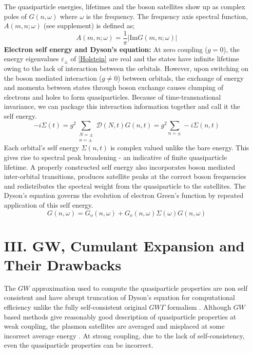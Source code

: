 \documentclass[%
 reprint,
 amsmath,amssymb,
 aps,prl,
floatfix
]{revtex4-2}
\begin{document}
The quasiparticle energies, lifetimes and the boson satellites show up as complex poles of $G(n,\omega)$ where $\omega$ is the frequency. The frequency axis spectral function, $A(m,n;\omega)$ (see supplement) is defined as;
 \begin{equation}
     A(m,n;\omega) = \frac{1}{\pi} |\text{Im}G(m,n;\omega)|
 \end{equation}
\textbf{Electron self energy and Dyson's equation: }
  At zero coupling ($g=0$), the energy eigenvalues $\varepsilon_{\pm}$ of \eqref{Holstein} are real and the states have infinite lifetime owing to the lack of interaction between the orbitals. However, upon switching on the boson mediated interaction ($g\neq0$) between orbitals, the exchange of energy and momenta between states through boson exchange causes clumping of electrons and holes to form quasiparticles. Because of time-transnational invariance, we can package this interaction information together and call it the self energy.
\begin{equation}
    -i\Sigma(t) = g^2\!\sum_{\substack{N=\pm\\n=\pm}} \mathcal{D}(N,t)G(n, t)= g^2 \!\sum_{n = \pm}\!\!\!-i\Sigma(n,t)
\label{self-energy}
\end{equation}
Each orbital's self energy $\Sigma(n, t)$ is complex valued unlike the bare energy. This gives rise to spectral peak broadening - an indicative of finite quasiparticle lifetime. A properly constructed self energy also incorporates boson mediated inter-orbital transitions, produces satellite peaks at the correct boson frequencies and redistributes the spectral weight from the quasiparticle to the satellites. The Dyson's equation governs the evolution of electron Green's function by repeated application of this self energy.
\begin{equation}
  G(n,\omega) = G_o(n,\omega) + G_o(n,\omega)\Sigma(\omega) G(n,\omega)
  \label{Dyson equation}
\end{equation}
\section{III. GW, Cumulant Expansion and Their Drawbacks}
The $GW$ approximation used to compute the quasiparticle properties are non self consistent and have abrupt truncation of Dyson's equation for computational efficiency unlike the fully self-consistent original $GW\Gamma$ formalism \cite{hedin_new_1965}. Although $GW$ based methods give reasonably good description of quasiparticle properties at weak coupling, the plasmon satellites are averaged and misplaced at some incorrect average energy \cite{langreth_singularities_1970}. At strong coupling, due to the lack of self-consistency, even the quasiparticle properties can be incorrect.
\end{document}
